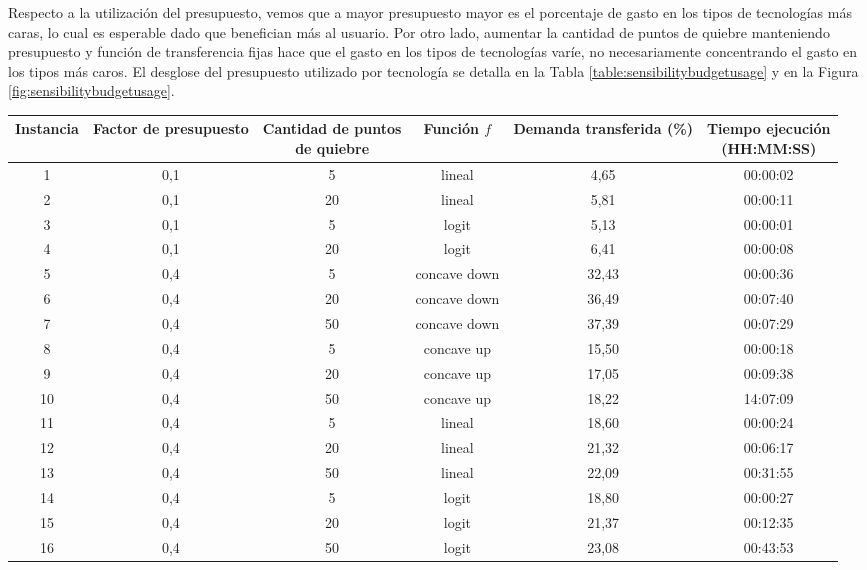 \documentclass{article}
\begin{document}
  Respecto a la utilización del presupuesto, vemos que a mayor presupuesto mayor es el porcentaje de gasto en los tipos de tecnologías más caras, lo cual es esperable dado que benefician más al usuario. Por otro lado, aumentar la cantidad de puntos de quiebre manteniendo presupuesto y función de transferencia fijas hace que el gasto en los tipos de tecnologías varíe, no necesariamente concentrando el gasto en los tipos más caros. El desglose del presupuesto utilizado por tecnología se detalla en la Tabla \ref{table:sensibilitybudgetusage} y en la Figura \ref{fig:sensibilitybudgetusage}.

  \begin{table}
    \centering
    \begin{tabular}{cccccc}
        \toprule
        Instancia & Factor de presupuesto & \shortstack{Cantidad de puntos \\ de quiebre} & Función $f$ & Demanda transferida (\%) & \shortstack{Tiempo ejecución \\ (HH:MM:SS)} \\
        \midrule
        1 & 0,1 & 5 & lineal & 4,65 & 00:00:02 \\
        2 & 0,1 & 20 & lineal & 5,81 & 00:00:11 \\
        3 & 0,1 & 5 & logit & 5,13 & 00:00:01 \\
        4 & 0,1 & 20 & logit & 6,41 & 00:00:08 \\
        5 & 0,4 & 5 & concave down & 32,43 & 00:00:36 \\
        6 & 0,4 & 20 & concave down & 36,49 & 00:07:40 \\
        7 & 0,4 & 50 & concave down & 37,39 & 00:07:29 \\
        8 & 0,4 & 5 & concave up & 15,50 & 00:00:18 \\
        9 & 0,4 & 20 & concave up & 17,05 & 00:09:38 \\
        10 & 0,4 & 50 & concave up & 18,22 & 14:07:09 \\
        11 & 0,4 & 5 & lineal & 18,60 & 00:00:24 \\
        12 & 0,4 & 20 & lineal & 21,32 & 00:06:17 \\
        13 & 0,4 & 50 & lineal & 22,09 & 00:31:55 \\
        14 & 0,4 & 5 & logit & 18,80 & 00:00:27 \\
        15 & 0,4 & 20 & logit & 21,37 & 00:12:35 \\
        16 & 0,4 & 50 & logit & 23,08 & 00:43:53 \\

\end{tabular}
\end{table}
\end{document}
